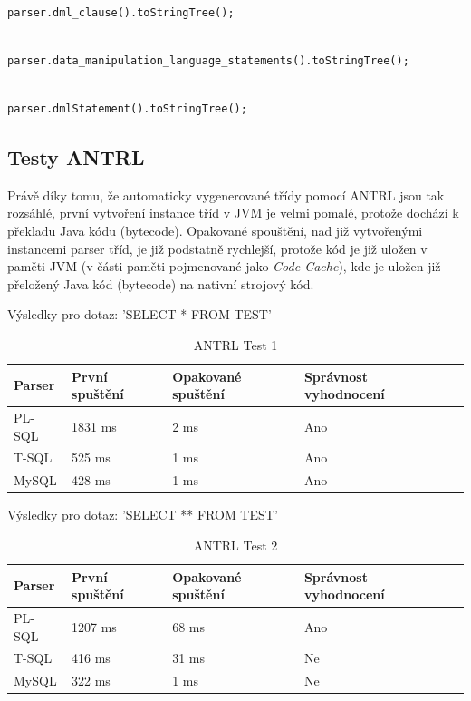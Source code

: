 \documentclass[czech,bachelor,public,dept460,male,cpdeclaration,twoside]{diploma}
\begin{document}
\begin{lstlisting}[caption=T-SQL Parser]

parser.dml_clause().toStringTree();
\end{lstlisting}

\begin{lstlisting}[caption=PL-SQL Parser]

parser.data_manipulation_language_statements().toStringTree();
\end{lstlisting}

\begin{lstlisting}[caption=MySQL Parser]

parser.dmlStatement().toStringTree();
\end{lstlisting}

\newpage

\subsection{Testy ANTRL}
Právě díky tomu, že automaticky vygenerované třídy pomocí ANTRL jsou tak rozsáhlé, první vytvoření instance tříd v JVM je velmi pomalé, protože dochází k překladu Java kódu (bytecode). Opakované spouštění, nad již vytvořenými instancemi parser tříd, je již podstatně rychlejší, protože kód je již uložen v paměti JVM (v části paměti pojmenované jako \textit{Code Cache}), kde je uložen již přeložený Java kód (bytecode) na nativní strojový kód.

\begin{table}[!htbp]
	\centering
	\caption{ANTRL Test 1}
	Výsledky pro dotaz: 'SELECT * FROM TEST'
	\vskip 0.1cm
	\label{tab:antrl1}
	\begin{tabular}{lllll}
		\toprule
		Parser & První spuštění & Opakované spuštění & Správnost vyhodnocení\\
		\midrule
		PL-SQL & 1831 ms & 2 ms & Ano \\
        T-SQL & 525 ms & 1 ms & Ano \\
        MySQL & 428 ms & 1 ms & Ano \\
		\midrule
	\end{tabular}
\end{table}

\begin{table}[!htbp]
	\centering
	\caption{ANTRL Test 2}
	Výsledky pro dotaz: 'SELECT ** FROM TEST'
	\vskip 0.1cm
	\label{tab:antrl2}
	\begin{tabular}{lllll}
		\toprule
		Parser & První spuštění & Opakované spuštění & Správnost vyhodnocení\\
		\midrule
		PL-SQL & 1207 ms & 68 ms & Ano \\
        T-SQL & 416 ms &31 ms & Ne \\
        MySQL & 322 ms & 1 ms & Ne \\
		\midrule
	\end{tabular}
\end{table}
\end{document}
